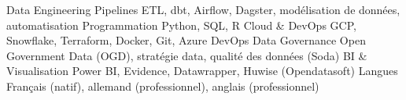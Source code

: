 \begin{cvskills}
  \cvskill
    {Data Engineering}
    {Pipelines ETL, dbt, Airflow, Dagster, modélisation de données, automatisation}
  \cvskill
    {Programmation}
    {Python, SQL, R}
  \cvskill
    {Cloud \& DevOps}
    {GCP, Snowflake, Terraform, Docker, Git, Azure DevOps}
  \cvskill
    {Data Governance}
    {Open Government Data (OGD), stratégie data, qualité des données (Soda)}
  \cvskill
    {BI \& Visualisation}
    {Power BI, Evidence, Datawrapper, Huwise (Opendatasoft)}
  \cvskill
    {Langues}
    {Français (natif), allemand (professionnel), anglais (professionnel)}
\end{cvskills}
